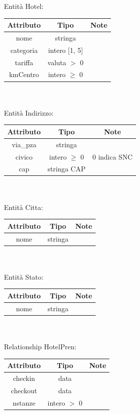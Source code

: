 \documentclass[a4paper,12pt]{report}
\begin{document}
      \hspace*{-0.75cm}
      Entità Hotel: \\
      \begin{tabular}{|c|c|c|}
        \hline Attributo & Tipo & Note \\
        \hline nome & stringa & \\
        \hline categoria & intero [1, 5] & \\
        \hline tariffa & valuta $>$ 0 & \\
        \hline kmCentro & intero $\geq$ 0 & \\
        \hline
      \end{tabular} \\ \\
      Entità Indirizzo: \\
      \begin{tabular}{|c|c|c|}
        \hline Attributo & Tipo & Note \\
        \hline via\_pza & stringa & \\
        \hline civico & intero $\geq$ 0 & 0 indica SNC \\
        \hline cap & stringa CAP & \\
        \hline
      \end{tabular} \\ \\
      Entità Citta: \\
      \begin{tabular}{|c|c|c|}
        \hline Attributo & Tipo & Note \\
        \hline nome & stringa & \\
        \hline
      \end{tabular} \\ \\
      Entità Stato: \\
      \begin{tabular}{|c|c|c|}
        \hline Attributo & Tipo & Note \\
        \hline nome & stringa & \\
        \hline
      \end{tabular} \\ \\
      Relationship HotelPren: \\
      \begin{tabular}{|c|c|c|}
        \hline Attributo & Tipo & Note \\
        \hline checkin & data & \\
        \hline checkout & data & \\
        \hline nstanze & intero $>$ 0 & \\
        \hline
      \end{tabular} \\
\end{document}
